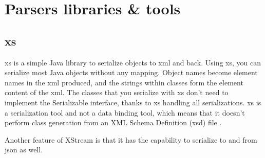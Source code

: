 \section{Parsers libraries \& tools}

\subsection{\gls{xs}}
\gls{xs} is a simple Java library to serialize objects to \gls{xml} and back. Using \gls{xs}, you can serialize most Java objects without any mapping. Object names become element names in the \gls{xml} produced, and the strings within classes form the element content of the \gls{xml}.
\newline
\newline
The classes that you serialize with \gls{xs} don't need to implement the Serializable interface, thanks to \gls{xs} handling all serializations. \gls{xs} is a serialization tool and not a data binding tool, which means that it doesn't perform class generation from an XML Schema Definition (\gls{xsd}) file \cite{bib:xstream} \cite{bib:ibm}.

Another feature of XStream is that it has the capability to serialize to and from \gls{json} as well.
